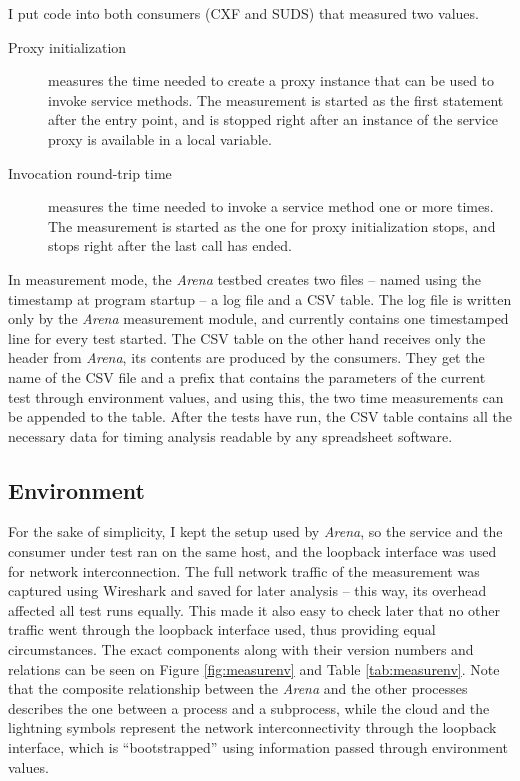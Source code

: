 \noindent
I put code into both consumers (CXF and SUDS) that measured two values.
\begin{description}
 \item[Proxy initialization] measures the time needed to create a proxy instance that can be used to invoke service methods. The measurement is started as the first statement after the entry point, and is stopped right after an instance of the service proxy is available in a local variable.
 \item[Invocation round-trip time] measures the time needed to invoke a service method one or more times. The measurement is started as the one for proxy initialization stops, and stops right after the last call has ended.
\end{description}

\noindent
In measurement mode, the \emph{Arena} testbed creates two files -- named using the timestamp at program startup -- a log file and a CSV table. The log file is written only by the \emph{Arena} measurement module, and currently contains one timestamped line for every test started. The CSV table on the other hand receives only the header from \emph{Arena}, its contents are produced by the consumers. They get the name of the CSV file and a prefix that contains the parameters of the current test through environment values, and using this, the two time measurements can be appended to the table. After the tests have run, the CSV table contains all the necessary data for timing analysis readable by any spreadsheet software.

\subsection{Environment}

For the sake of simplicity, I kept the setup used by \emph{Arena}, so the service and the consumer under test ran on the same host, and the loopback interface was used for network interconnection. The full network traffic of the measurement was captured using Wireshark and saved for later analysis -- this way, its overhead affected all test runs equally. This made it also easy to check later that no other traffic went through the loopback interface used, thus providing equal circumstances. The exact components along with their version numbers and relations can be seen on Figure \ref{fig:measurenv} and Table \ref{tab:measurenv}. Note that the composite relationship between the \emph{Arena} and the other processes describes the one between a process and a subprocess, while the cloud and the lightning symbols represent the network interconnectivity through the loopback interface, which is ``bootstrapped'' using information passed through environment values.

